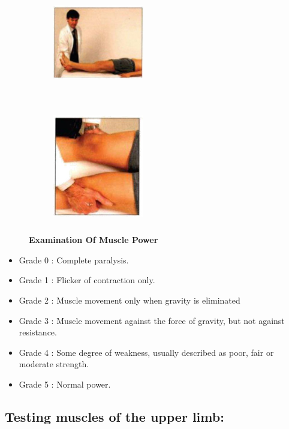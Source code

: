 \documentclass[a4paper,12pt,openany,twoside]{book}
\begin{document}
{\begin{figure}[H]
		\begin{subfigure}[t]{.25\textwidth}
			\includegraphics[width=4cm,height=5cm]{./clinicalPhysioPic/motorSystem/hipExtension.jpg}
		\end{subfigure}
		\hspace{\fill}
		\begin{subfigure}[t]{.25\textwidth}
			\includegraphics[width=4cm,height=5cm]{./clinicalPhysioPic/motorSystem/hipAbduction.jpg}
		\end{subfigure}
		\caption*{\textbf{Examination Of Muscle Power}}
	\end{figure}
}
	\begin{itemize}
			\itemsep0em
\item[]	Grade 0 	:	Complete paralysis. 
\item[]	Grade 1 	: 	Flicker of contraction only.
\item[]		Grade 2 	: Muscle movement only when gravity is eliminated
\item[]	Grade 3 	:	Muscle movement against the force of gravity, but not against resistance.
\item[]	Grade 4 :	Some degree of weakness, usually described as poor, fair or moderate 		strength.
\item[]	Grade 5 	:	Normal power.
	\end{itemize}
	


	\subsection*{Testing muscles of the upper limb:}
\end{document}
